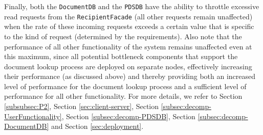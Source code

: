 \documentclass[a4paper,10pt]{article}
\begin{document}
Finally, both the \texttt{DocumentDB} and the \texttt{PDSDB} have the ability to throttle excessive read requests from the \texttt{RecipientFacade} (all other requests remain unaffected) when the rate of these incoming requests exceeds a certain value that is specific to the kind of request (determined by the requirements). Also note that the performance of all other functionality of the system remains unaffected even at this maximum, since all potential bottleneck components that support the document lookup process are deployed on separate nodes, effectively increasing their performance (as discussed above) and thereby providing both an increased level of performance for the document lookup process and a sufficient level of performance for all other functionality.
For more details, we refer to Section \ref{subsubsec:P2}, Section \ref{sec:client-server}, Section \ref{subsec:decomp-UserFunctionality}, Section \ref{subsec:decomp-PDSDB}, Section \ref{subsec:decomp-DocumentDB} and Section \ref{sec:deployment}.
\end{document}
